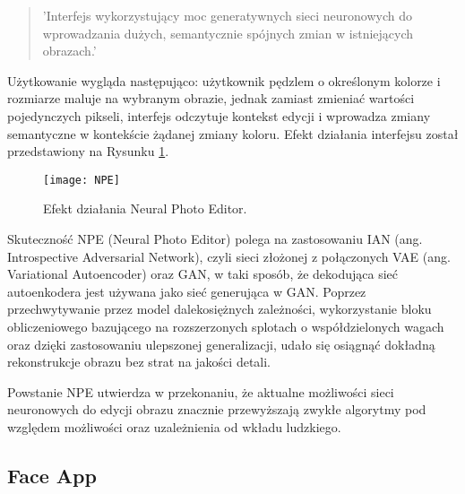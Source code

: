     \begin{quote}
      'Interfejs wykorzystujący moc generatywnych sieci neuronowych do
      wprowadzania dużych, semantycznie spójnych zmian w istniejących obrazach.'
    \end{quote}

    Użytkowanie wygląda następująco: użytkownik pędzlem o określonym kolorze i
    rozmiarze maluje na wybranym obrazie, jednak zamiast zmieniać wartości
    pojedynczych pikseli, interfejs odczytuje kontekst edycji i wprowadza zmiany
    semantyczne w kontekście żądanej zmiany koloru. Efekt działania interfejsu
    został przedstawiony na Rysunku \ref{fig:npe}.

    \begin{figure}[ht]
      \centering
      \texttt{[image: NPE]}
      \caption{Efekt działania Neural Photo Editor.}
      \label{fig:npe}
    \end{figure}

    Skuteczność NPE (Neural Photo Editor) polega na zastosowaniu IAN
    (ang. Introspective Adversarial Network), czyli sieci złożonej z połączonych
    VAE (ang. Variational Autoencoder) \cite{vae} oraz GAN, w taki sposób, że dekodująca
    sieć autoenkodera jest używana jako sieć generująca w GAN.
    Poprzez przechwytywanie przez model dalekosiężnych zależności, wykorzystanie
    bloku obliczeniowego bazującego na rozszerzonych splotach o
    współdzielonych wagach oraz dzięki zastosowaniu ulepszonej generalizacji,
    udało się osiągnąć dokładną rekonstrukcje obrazu bez strat na jakości detali.

    Powstanie NPE utwierdza w przekonaniu, że aktualne możliwości sieci
    neuronowych do edycji obrazu znacznie przewyższają zwykłe algorytmy pod
    względem możliwości oraz uzależnienia od wkładu ludzkiego.


  \subsection{Face App}

